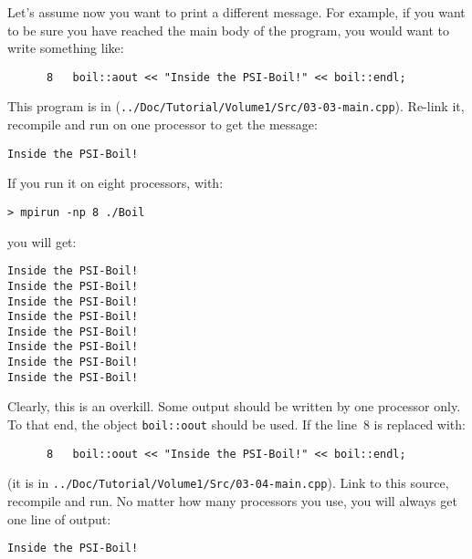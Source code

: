 Let's assume now you want to print a different message. For example, if you
want to be sure you have reached the main body of the program, you would
want to write something like:
%
{\small \begin{verbatim}
      8   boil::aout << "Inside the PSI-Boil!" << boil::endl;
\end{verbatim}}
%
This program is in ({\tt ../Doc/Tutorial/Volume1/Src/03-03-main.cpp}). Re-link
it, recompile and run on one processor to get the message:
%
{\small \begin{verbatim}
Inside the PSI-Boil!
\end{verbatim}}
%
If you run it on eight processors, with:
%
\begin{verbatim}
> mpirun -np 8 ./Boil
\end{verbatim}
%
you will get:
%
{\small \begin{verbatim}
Inside the PSI-Boil!
Inside the PSI-Boil!
Inside the PSI-Boil!
Inside the PSI-Boil!
Inside the PSI-Boil!
Inside the PSI-Boil!
Inside the PSI-Boil!
Inside the PSI-Boil!
\end{verbatim}}
%
Clearly, this is an overkill. Some output should be written by one processor
only. To that end, the object {\tt boil::oout} should be used. If the line~8
is replaced with:
%
{\small \begin{verbatim}
      8   boil::oout << "Inside the PSI-Boil!" << boil::endl;
\end{verbatim}}
%
(it is in {\tt ../Doc/Tutorial/Volume1/Src/03-04-main.cpp}). Link to this
source, recompile and run. No matter how many processors you use, you will
always get one line of output:
%
{\small \begin{verbatim}
Inside the PSI-Boil!
\end{verbatim}}
%

\vspace*{5mm}  %

